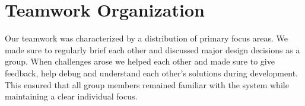 \section{Teamwork Organization}



Our teamwork was characterized by a distribution of primary focus areas.
We made sure to regularly brief each other and discussed major design decisions as a group.
When challenges arose we helped each other and made sure to give feedback, help debug and understand each other's
solutions during development. This ensured that all group members remained familiar with the system while maintaining a clear individual focus.